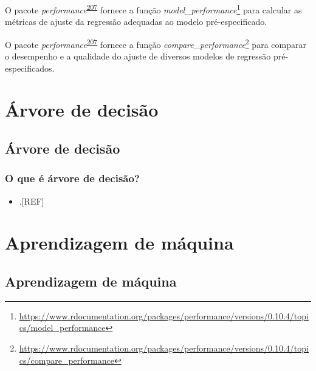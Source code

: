\documentclass[
  a4paper,
]{book}
\providecommand{\tightlist}{%
  \setlength{\itemsep}{0pt}\setlength{\parskip}{0pt}}
\renewcommand{\href}[2]{#2\footnote{\url{#1}}}
\newenvironment{infobox}[1]
  {
  \begin{itemize}
  \renewcommand{\labelitemi}{
    \raisebox{-.7\height}[0pt][0pt]{
      {\setkeys{Gin}{width=3em,keepaspectratio}
        \texttt{[image: \#1]}}
    }
  }
  \setlength{\fboxsep}{1em}
  \begin{blackbox}
  \item
  }
  {
  \end{blackbox}
  \end{itemize}
  }
\begin{document}
\begin{infobox}{images/Rlogo}
O pacote \emph{performance}\textsuperscript{\protect\hyperlink{ref-performance}{207}} fornece a função \href{https://www.rdocumentation.org/packages/performance/versions/0.10.4/topics/model_performance}{\emph{model\_performance}} para calcular as métricas de ajuste da regressão adequadas ao modelo pré-especificado.

\end{infobox}

\begin{infobox}{images/Rlogo}
O pacote \emph{performance}\textsuperscript{\protect\hyperlink{ref-performance}{207}} fornece a função \href{https://www.rdocumentation.org/packages/performance/versions/0.10.4/topics/compare_performance}{\emph{compare\_performance}} para comparar o desempenho e a qualidade do ajuste de diversos modelos de regressão pré-especificados.

\end{infobox}

\hypertarget{arvore-decisao}{%
\chapter{\texorpdfstring{\textbf{Árvore de decisão}}{Árvore de decisão}}\label{arvore-decisao}}

\hypertarget{arvore-decisao}{%
\section{Árvore de decisão}\label{arvore-decisao}}

\hypertarget{o-que-uxe9-uxe1rvore-de-decisuxe3o}{%
\subsection{O que é árvore de decisão?}\label{o-que-uxe9-uxe1rvore-de-decisuxe3o}}

\begin{itemize}
\tightlist
\item
  .{[}REF{]}
\end{itemize}

\hypertarget{aprendizagem-maquina}{%
\chapter{\texorpdfstring{\textbf{Aprendizagem de máquina}}{Aprendizagem de máquina}}\label{aprendizagem-maquina}}

\hypertarget{aprendizagem-maquina}{%
\section{Aprendizagem de máquina}\label{aprendizagem-maquina}}
\end{document}
